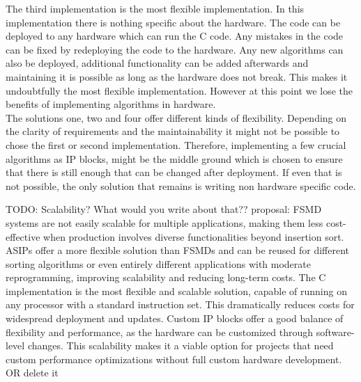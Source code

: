 \documentclass[conference]{IEEEtran}
\begin{document}
The third implementation is the most flexible implementation. In this implementation there is nothing specific about the hardware. The code can be deployed to any hardware which can run the C code. Any mistakes in the code can be fixed by redeploying the code to the hardware. Any new algorithms can also be deployed, additional functionality can be added afterwards and maintaining it is possible as long as the hardware does not break. This makes it undoubtfully the most flexible implementation. However at this point we lose the benefits of implementing algorithms in hardware. \\
The solutions one, two and four offer different kinds of flexibility. Depending on the clarity of requirements and the maintainability it might not be possible to chose the first or second implementation. Therefore, implementing a few crucial algorithms as IP blocks, might be the middle ground which is chosen to ensure that there is still enough that can be changed after deployment. If even that is not possible, the only solution that remains is writing non hardware specific code.

TODO: Scalability? What would you write about that??
proposal:
FSMD systems are not easily scalable for multiple applications, making them less cost-effective when production involves diverse functionalities beyond insertion sort.
ASIPs offer a more flexible solution than FSMDs and can be reused for different sorting algorithms or even entirely different applications with moderate reprogramming, improving scalability and reducing long-term costs.
The C implementation is the most flexible and scalable solution, capable of running on any processor with a standard instruction set. This dramatically reduces costs for widespread deployment and updates.
Custom IP blocks offer a good balance of flexibility and performance, as the hardware can be customized through software-level changes. This scalability makes it a viable option for projects that need custom performance optimizations without full custom hardware development.
OR delete it
\end{document}
